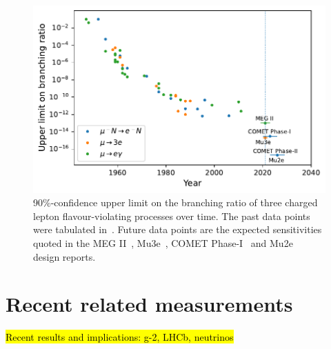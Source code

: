 \begin{figure}
    \centering
    \includegraphics{chapter1/clfv_upper_limit.pdf}
    \caption{90\%-confidence upper limit on the branching ratio of three charged lepton flavour-violating processes over time. The past data points were tabulated in~\cite{BERNSTEIN201327}. Future data points are the expected sensitivities quoted in the MEG II~\cite{Baldini2018}, Mu3e~\cite{ARNDT2021165679}, COMET Phase-I~\cite{the_comet_collaboration_comet_2020} and Mu2e~\cite{bartoszek2015mu2e} design reports.}
    \label{fig:clfv_upper_limit}
\end{figure}


\section{Recent related measurements}
\hl{Recent results and implications: g-2, LHCb, neutrinos}

\cite{PhysRevLett.126.141801} %

\cite{lhcbcollaboration2021test} %


%
%
%
%
